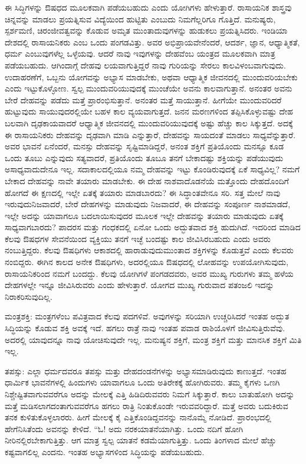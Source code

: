 ಈ ಸಿದ್ಧಿಗಳನ್ನು ಔಷಧದ ಮೂಲಕವಾಗಿ ಪಡೆಯಬಹುದು ಎಂದು ಯೋಗಿಗಳು ಹೇಳುತ್ತಾರೆ. ರಾಸಾಯನಿಕ ಶಾಸ್ತ್ರವು ಚಿನ್ನವನ್ನು ಮಾಡಲು ಪ್ರಯತ್ನಿಸುವ ವಿದ್ಯೆಯಿಂದ ಹುಟ್ಟಿತು ಎಂಬುದು ನಿಮಗೆಲ್ಲರಿಗೂ ಗೊತ್ತಿದೆ. ಮನುಷ್ಯರು, ಸ್ಪರ್ಶಮಣಿ, ಚಿರಂಜೀವತ್ವವನ್ನು ಕೊಡುವ ಅಮೃತ ಮುಂತಾದುವುಗಳನ್ನು ಹುಡುಕಲು ಪ್ರಯತ್ನಿಸಿದರು. ಇಂಡಿಯಾ ದೇಶದಲ್ಲಿ ರಾಸಾಯನಿಕರು ಎಂಬ ಒಂದು ಪಂಗಡವಿತ್ತು. ಅವರ ಅಭಿಪ್ರಾಯವೇನೆಂದರೆ, ಆದರ್ಶ, ಜ್ಞಾನ, ಆಧ್ಯಾತ್ಮಿಕತೆ, ಧರ್ಮ ಎಂಬುವುಗಳೆಲ್ಲ ಒಳ್ಳೆಯವು. ಆದರೆ ನಾವು ಇವುಗಳನ್ನು ದೇಹವೆಂಬ ಯಂತ್ರದ ಮೂಲಕವಾಗಿ ಮಾತ್ರ ಪಡೆಯಬಹುದು. ಆಗಿಂದಾಗ್ಗೆ ದೇಹವು ಲಯವಾಗುತ್ತಿದ್ದರೆ ನಾವು ಗುರಿಯನ್ನು ಸೇರಲು ಕಾಲವಿಳಂಬವಾಗುವುದು. ಉದಾಹರಣೆಗೆ, ಒಬ್ಬನು ಯೋಗವನ್ನು ಅಭ್ಯಾಸ ಮಾಡಬೇಕು, ಅಥವಾ ಆಧ್ಯಾತ್ಮಿಕ ಜೀವನದಲ್ಲಿ ಮುಂದುವರಿಯಬೇಕು ಎಂದು ಇಟ್ಟುಕೊಳ್ಳೋಣ. ಸ್ವಲ್ಪ ಮುಂದುವರಿಯುವುದಕ್ಕೆ ಮುಂಚೆಯೇ ಅವನು ಕಾಲವಾಗುತ್ತಾನೆ. ಅನಂತರ ಅವನು ಬೇರೆ ದೇಹವನ್ನು ಪಡೆದು ಮತ್ತೆ ಪ್ರಾರಂಭಿಸುತ್ತಾನೆ. ಅನಂತರ ಮತ್ತೆ ಸಾಯುತ್ತಾನೆ. ಹೀಗೆಯೇ ಮುಂದುವರಿದರೆ ಹುಟ್ಟುವುದು ಸಾಯುವುದರಲ್ಲಿಯೇ ಬಹಳ ಕಾಲ ವ್ಯಯವಾಗುತ್ತದೆ. ಜನನ ಮರಣಗಳಿಂದ ತಪ್ಪಿಸಿಕೊಳ್ಳುವಷ್ಟು ದೇಹ ಬಲವಾಗಿ ದೃಢಕಾಯವಾದರೆ ಆಧ್ಯಾತ್ಮಿಕ ಜೀವನದಲ್ಲಿ ಮುಂದುವರಿಯುವುದಕ್ಕೆ ಅಷ್ಟು ಹೆಚ್ಚು ಕಾಲ ಸಿಕ್ಕುತ್ತದೆ. ಅದಕ್ಕೆ ಈ ರಾಸಾಯನಿಕರು ದೇಹವನ್ನು ದೃಢವಾಗಿ ಮಾಡಿ ಎನ್ನುತ್ತಾರೆ, ದೇಹವನ್ನು ಸಾಯದಂತೆ ಮಾಡಲು ಸಾಧ್ಯವೆನ್ನುತ್ತಾರೆ. ಅವರ ಭಾವನೆ ಏನೆಂದರೆ, ಮನಸ್ಸು ದೇಹವನ್ನು ಸೃಷ್ಟಿಮಾಡಿದ್ದರೆ, ಅನಂತ ಶಕ್ತಿಗೆ ಪ್ರತಿಯೊಂದು ಮನಸ್ಸೂ ಕೂಡ ಒಂದು ತೂಬು ಎನ್ನುವುದು ಸತ್ಯವಾದರೆ, ಪ್ರತಿಯೊಂದು ತೂಬೂ ತನಗೆ ಬೇಕಾದಷ್ಟು ಶಕ್ತಿಯನ್ನು ಪಡೆಯುವುದು ಅಸಾಧ್ಯವಾದುದೇನೂ ಇಲ್ಲ. ಸದಾಕಾಲದಲ್ಲಿಯೂ ನಮ್ಮ ದೇಹವನ್ನು ಇಟ್ಟು ಕೊಂಡಿರುವುದಕ್ಕೆ ಏಕೆ ಸಾಧ್ಯವಿಲ್ಲ? ನಮಗೆ ಬೇಕಾದ ದೇಹವನ್ನು ನಾವೇ ತಯಾರು ಮಾಡಬೇಕು. ಈ ದೇಹ ನಾಶವಾದೊಡನೆಯೆ ಮತ್ತೊಂದು ದೇಹದೊಂದಿಗೆ ಹೋಗದೆ ಈ ಕ್ಷಣದಲ್ಲಿ ಇಲ್ಲೇ ಏತಕ್ಕೆ ತಯಾರು ಮಾಡಬಾರದು? ಈ ಸಿದ್ಧಾಂತವೇನೂ ಸರಿ. ಸತ್ತ ಮೇಲೆ ನಾವು ಇರುವುದು\break ನಿಜವಾದರೆ, ಬೇರೆ ದೇಹಗಳನ್ನು ಮಾಡುವುದು ನಿಜವಾದರೆ, ಈ ದೇಹವನ್ನು ಸಂಪೂರ್ಣ ನಾಶಮಾಡದೆ, ಇಲ್ಲೇ ಅದನ್ನು ಯಾವಾಗಲೂ ಬದಲಾಯಿಸುವುದರ ಮೂಲಕ ಇಲ್ಲೇ ದೇಹವನ್ನು ತಯಾರು ಮಾಡುವುದು ಏತಕ್ಕೆ ಸಾಧ್ಯವಾಗಬಾರದು? ಪಾದರಸ ಮತ್ತು ಗಂಧಕದಲ್ಲಿ ಏನೋ ಒಂದು ಅದ್ಭುತವಾದ ಶಕ್ತಿ ಹುದುಗಿದೆ. ಇದರಿಂದ ಮಾಡಿದ ಕೆಲವು ಔಷಧಗಳ ಸೇವನೆಯಿಂದ ವ್ಯಕ್ತಿಯು ತನಗೆ ಇಚ್ಛೆ ಬಂದಷ್ಟು ಕಾಲ ಜೀವಿಸಿರಬಹುದು ಎಂದು ಅವರು ನಂಬುತ್ತಿದ್ದರು. ಕೆಲವು ಔಷಧಿಗಳು ಆಕಾಶದಲ್ಲಿ ಹಾರಾಡುವುದು\break ಮುಂತಾದ ಶಕ್ತಿಗಳನ್ನು ಕೊಡುತ್ತವೆ ಎಂದು ಕೆಲವರು ನಂಬಿದ್ದರು. ಈಗಿನ ಕಾಲದ ಅನೇಕ ಔಷಧಿಗಳು, ಅದರಲ್ಲಿಯೂ ಔಷಧದಲ್ಲಿ ಲೋಹವನ್ನು ಉಪಯೋಗಿಸುವುದು, ರಾಸಾಯನಿಕರಿಂದ ನಮಗೆ ಬಂದದ್ದು. ಕೆಲವು ಯೋಗಿಗಳೆ ಪಂಗಡದವರು, ಅವರ ಮುಖ್ಯ ಗುರುಗಳು ತಮ್ಮ ಹಳೆಯ ದೇಹಗಳಲ್ಲೇ ಇನ್ನೂ ಜೀವಿಸಿರುವರು ಎಂದು ಹೇಳುತ್ತಾರೆ. ಯೋಗದ ಮುಖ್ಯ ಗುರುವಾದ ಪತಂಜಲಿ ಇದನ್ನು ನಿರಾಕರಿಸುವುದಿಲ್ಲ. 

ಮಂತ್ರಶಕ್ತಿ: ಮಂತ್ರಗಳೆಂಬ ಪವಿತ್ರವಾದ ಕೆಲವು ಪದಗಳಿವೆ. ಅವುಗಳನ್ನು ಸರಿಯಾಗಿ ಉಚ್ಚರಿಸಿದರೆ ಇಂತಹ ಅದ್ಭುತ ಸಿದ್ಧಿಯನ್ನು ಕೊಡುವ ಶಕ್ತಿ ಅವಕ್ಕೆ ಇದೆ. ಹಗಲು ರಾತ್ರೆ ನಾವು ಇಂತಹ ಪವಾಡ ರಾಶಿಯೊಳಗೆ ಜೀವಿಸುತ್ತಿರುವೆವು. ಅದರಲ್ಲಿ ಯಾವುದನ್ನೂ ನಾವು ಯೋಚಿಸುವುದೇ ಇಲ್ಲ. ಮನುಷ್ಯನ ಶಕ್ತಿಗೆ, ಮಂತ್ರ ಶಕ್ತಿಗೆ ಮತ್ತು ಮಾನಸಿಕ ಶಕ್ತಿಗೆ ಮಿತಿ ಇಲ್ಲ. 

ತಪಸ್ಸು: ಎಲ್ಲಾ ಧರ್ಮದವರೂ ತಪಸ್ಸು ಮತ್ತು ದೇಹದಂಡನೆಗಳನ್ನು ಅಭ್ಯಾಸಮಾಡಿರುವುದು ಕಾಣುತ್ತದೆ. ಇಂತಹ ಧಾರ್ಮಿಕ ಭಾವನೆಗಳಲ್ಲಿ ಹಿಂದುಗಳು ಯಾವಾಗಲೂ ಒಂದು ಅತಿರೇಕಕ್ಕೆ ಹೋಗಿರುವರು. ತಮ್ಮ ಕೈಗಳು ಒಣಗಿ ನಿಶ್ಚೇಷ್ಟಿತವಾಗುವವರೆಗೂ ಅದನ್ನು ಮೇಲಕ್ಕೆ ಎತ್ತಿ ಹಿಡಿದಿರುವವರು ನಿಮಗೆ ಸಿಕ್ಕುತ್ತಾರೆ. ಕಾಲು ಬಾತುಹೋಗಿ ಅದನ್ನು ಮತ್ತೆ ಮಡಿಸಲಾಗದಂತಾಗುವವರೆಗೂ ಹಗಲು ರಾತ್ರಿ ನಿಂತುಕೊಂಡೇ ಇರುವವರಿದ್ದಾರೆ. ಮತ್ತೆ ಅವರು ಬದುಕಿರುವ ತನಕ ಕುಳಿತುಕೊಳ್ಳಲಾರರು. ಹೀಗೆ ಮೇಲಕ್ಕೆ ಕೈ ಎತ್ತಿಕೊಂಡಿದ್ದವನನ್ನು ನಾನೊಮ್ಮೆ ನೋಡಿದೆ. ಪ್ರಾರಂಭದಲ್ಲಿ ಹೇಗೆನಿಸಿತೆಂದು ಅವನನ್ನು ಕೇಳಿದೆ. “ಓ! ಅದು ನರಕಯಾತನೆಯಾಗಿತ್ತು. ಒಂದು ನದಿಗೆ ಹೋಗಿ ನೀರಿನಲ್ಲಿರಬೇಕಾಗುತ್ತಿತ್ತು. ಆಗ ಮಾತ್ರ ಸ್ವಲ್ಪ ಯಾತನೆ ಕಡಮೆಯಾಗುತ್ತಿತ್ತು. ಒಂದು ತಿಂಗಳಾದ ಮೇಲೆ ಹೆಚ್ಚು ಕಷ್ಟವಾಗಲಿಲ್ಲ ಎಂದನು. ಇಂತಹ ಅಭ್ಯಾಸಗಳಿಂದ ಸಿದ್ಧಿಯನ್ನು ಪಡೆಯಬಹುದು. 

